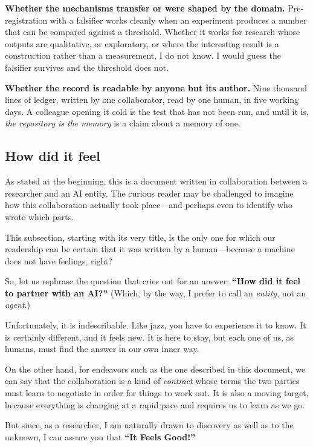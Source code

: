 \textbf{Whether the mechanisms transfer or were shaped by the domain.} Pre-registration with a falsifier works cleanly when an experiment produces a number that can be compared against a threshold. Whether it works for research whose outputs are qualitative, or exploratory, or where the interesting result is a construction rather than a measurement, I do not know. I would guess the falsifier survives and the threshold does not.

\textbf{Whether the record is readable by anyone but its author.} Nine thousand lines of ledger, written by one collaborator, read by one human, in five working days. A colleague opening it cold is the test that has not been run, and until it is, \textit{the repository is the memory} is a claim about a memory of one.

\subsection{How did it feel}

As stated at the beginning, this is a document written in collaboration between a researcher and an AI entity. The curious reader may be challenged to imagine how this collaboration actually took place---and perhaps even to identify who wrote which parts.

This subsection, starting with its very title, is the only one for which our readership can be certain that it was written by a human---because a machine does not have feelings, right?

So, let us rephrase the question that cries out for an answer: \textbf{``How did it feel to partner with an AI?''} (Which, by the way, I prefer to call an \textit{entity}, not an \textit{agent}.)

Unfortunately, it is indescribable. Like jazz, you have to experience it to know. It is certainly different, and it feels new. It is here to stay, but each one of us, as humans, must find the answer in our own inner way.

On the other hand, for endeavors such as the one described in this document, we can say that the collaboration is a kind of \textit{contract} whose terms the two parties must learn to negotiate in order for things to work out. It is also a moving target, because everything is changing at a rapid pace and requires us to learn as we go.

But since, as a researcher, I am naturally drawn to discovery as well as to the unknown, I can assure you that \textbf{``It Feels Good!''}

